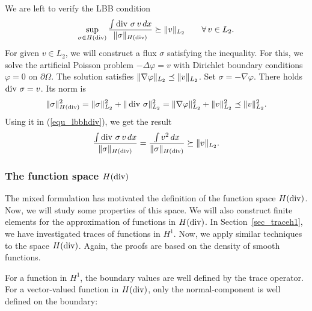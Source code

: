 We are left to verify the LBB condition
\begin{equation} \label{equ_lbbhdiv}
\sup_{\sigma \in H(\operatorname{div})} \frac{\int \operatorname{div} \, \sigma \,  v \, dx} { \| \sigma \|_{H(\operatorname{div})}}
\succeq \| v \|_{L_2} \qquad \forall \, v \in L_2.
\end{equation}
For given $v \in L_2$, we will construct a flux $\sigma$ satisfying the 
inequality.
For this, we solve the artificial Poisson problem $-\Delta \varphi = v$ with
Dirichlet boundary conditions $\varphi = 0$ on $\partial \Omega$. The solution
satisfies $\| \nabla \varphi \|_{L_2} \preceq \| v \|_{L_2}$. Set $\sigma = -\nabla \varphi$. There holds $\operatorname{div} \, \sigma = v$. Its norm is
$$
\| \sigma \|_{H(\operatorname{div})}^2 = \| \sigma \|_{L_2}^2 + \| \operatorname{div} \, \sigma \|_{L_2}^2
        = \| \nabla \varphi \|_{L_2}^2 + \| v \|_{L_2}^2 \preceq \| v \|_{L_2}^2.
$$
Using it in (\ref{equ_lbbhdiv}), we get the result
$$
\frac{ \int \operatorname{div} \, \sigma \, v \, dx} { \| \sigma \|_{H(\operatorname{div})}}
 = \frac{ \int v^2 \, dx} { \| \sigma \|_{H(\operatorname{div})}} \succeq \| v \|_{L_2}.
$$

\subsubsection{The function space $H(\operatorname{div})$}

The mixed formulation has motivated the definition of the function
space $H(\operatorname{div})$. Now, we will study some properties of this
space. We will also construct finite elements for the approximation of
functions in $H(\operatorname{div})$.  In Section~\ref{sec_traceh1}, we have
investigated traces of functions in $H^1$. Now, we apply similar
techniques to the space $H(\operatorname{div})$. Again, the proofs are based on
the density of smooth functions.

For a function in $H^1$, the boundary values are well defined by the 
trace operator. For a vector-valued function in $H(\operatorname{div})$, only the 
normal-component is well defined on the boundary:

